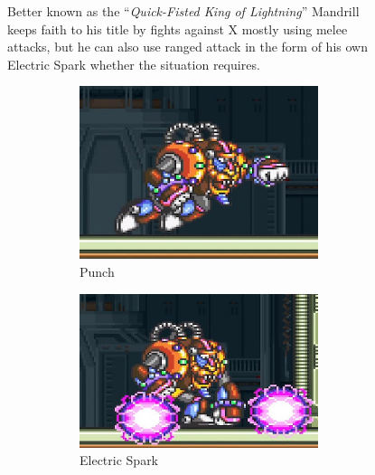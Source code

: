 \begin{figure}[htp]
Better known as the ``\textit{Quick-Fisted King of Lightning}'' Mandrill keeps faith to his title by fights against X mostly using melee attacks, but he can also use ranged attack in the form of his own Electric Spark whether the situation requires.
 \begin{figure}[htp]
	\centering
	\begin{subfigure}{0.4\linewidth}
		\centering
		\includegraphics[width=\linewidth]{figures/X1/Spark_mandrill/Mandrill_punch.jpg}
		\caption{Punch}
	\end{subfigure}
	\begin{subfigure}{0.45\linewidth}
		\centering
		\includegraphics[width=\linewidth]{figures/X1/Spark_mandrill/Mandrill_spark.jpg}
		\caption{Electric Spark}
	\end{subfigure}
	\begin{subfigure}[t]{0.4\linewidth}

\end{subfigure}
\end{figure}
\end{figure}
